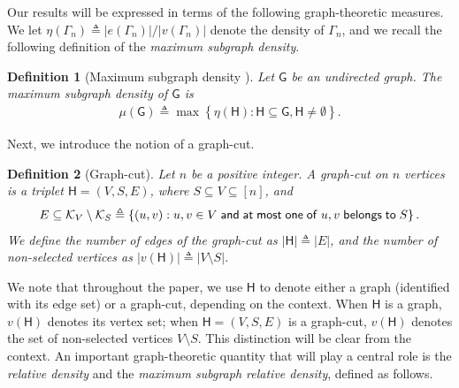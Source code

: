 \documentclass[12pt]{article}
\newtheorem{definition}{Definition}
\newcommand{\sd}{\mu}
\newcommand{\calK}{{\cal K}}
\newcommand{\ppp}[1]{\left\{#1\right\}}
\newcommand{\s}[1]{\mathsf{#1}}
\begin{document}
Our results will be expressed in terms of the following graph-theoretic measures. We let $\eta\left(\Gamma_n\right)\triangleq|e(\Gamma_n)|/|v(\Gamma_n)|$ denote the density of $\Gamma_n$, and we recall the following definition of the \emph{maximum subgraph density}.
\begin{definition}[Maximum subgraph density \cite{bollobas_2001}]\label{def:maxsubden}
Let $\s{G}$ be an undirected graph. The maximum subgraph density of $\s{G}$ is
\begin{align}
\sd(\s{G})\triangleq\max\ppp{\eta(\s{H}):\s{H}\subseteq\s{G},\s{H}\neq\emptyset}.\label{eqn:maxDensity}
\end{align}
\end{definition}
Next, we introduce the notion of a graph-cut.
\begin{definition}[Graph-cut]\label{def:gcut}
Let $n$ be a positive integer. A graph-cut on $n$ vertices is a triplet $\s{H} = (V,S,E)$, where $S \subseteq V \subseteq [n]$, and
\begin{align}
E \subseteq \calK_V \setminus \calK_S \triangleq \left\{(u,v) : u,v \in V \;\s{and}\;\s{at}\;\s{most}\;\s{one}\;\s{of}\;u,v\;\s{belongs}\;\s{to}\; S \right\}.
\end{align}
We define the number of edges of the graph-cut as $|\s{H}|\triangleq|E|$, and the number of non-selected vertices as $|v(\s{H})|\triangleq|V \setminus S|$.
\end{definition}
We note that throughout the paper, we use $\s{H}$ to denote either a graph (identified with its edge set) or a graph-cut, depending on the context. When $\s{H}$ is a graph, $v(\s{H})$ denotes its vertex set; when $\s{H}=(V,S,E)$ is a graph-cut, $v(\s{H})$ denotes the set of non-selected vertices $V\setminus S$. This distinction will be clear from the context. An important graph-theoretic quantity that will play a central role is the \emph{relative density} and the \emph{maximum subgraph relative density}, defined as follows.
\end{document}
